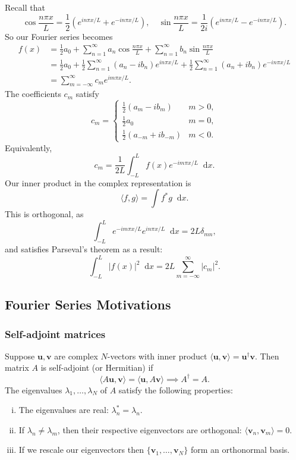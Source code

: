\documentclass[12pt]{article}
\newcommand{\diff}{\mathop{}\!\mathrm{d}}
\theoremstyle{definition}
\theoremstyle{remark}
\begin{document}
Recall that
\[
	\cos \frac{n \pi x}{L} = \frac{1}{2} \left( e^{i n \pi x/L} + e^{-i n \pi x/L}\right), \quad \sin \frac{n \pi x}{L} = \frac{1}{2i} \left(e^{i n \pi x/L} - e^{-i n \pi x/L}\right)
.\]
So our Fourier series becomes
\begin{align*}
	f(x) &= \frac{1}{2} a_0 + \sum_{n = 1}^{\infty}a_n \cos \frac{n \pi x}{L} + \sum_{n = 1}^{\infty} b_n \sin \frac{n \pi x}{L} \\
	     &= \frac{1}{2} a_0 + \frac{1}{2} \sum_{n = 1}^{\infty}(a_n - i b_n) e^{i n \pi x/L} + \frac{1}{2} \sum_{n = 1}^{\infty}(a_n + i b_n) e^{-i n \pi x/L} \\
	     &= \sum_{m = -\infty}^{\infty} c_m e^{i m \pi x/L}.
\end{align*}
The coefficients $c_m$ satisfy
\[
c_m =
\begin{cases}
	\frac{1}{2}(a_{m} - ib_{m}) & m > 0, \\
	\frac{1}{2} a_0 & m = 0, \\
	\frac{1}{2}(a_{-m} + i b_{-m}) & m < 0.
\end{cases}
\]
Equivalently,
\[
	c_m = \frac{1}{2L}\int_{-L}^{L}f(x) e^{-i m \pi x/L}\diff x
.\]
Our inner product in the complex representation is
\[
	\langle f, g \rangle = \int f^{\ast}g \diff x
.\]
This is orthogonal, as
\[
\int_{-L}^{L} e^{-i m \pi x/L}e^{i n \pi x/L} \diff x = 2L \delta_{mn}
,\]
and satisfies Parseval's theorem as a result:
\[
	\int_{-L}^{L}|f(x)|^2\diff x = 2L \sum_{m = -\infty}^{\infty}|c_m|^2
.\]

\subsection{Fourier Series Motivations}%
\label{sub:fourier_series_motivations}

\subsubsection{Self-adjoint matrices}%
\label{subsub:self_adjoint_matrices}

Suppose $\mathbf{u}, \mathbf{v}$ are complex $N$-vectors with inner product $\langle \mathbf{u}, \mathbf{v} \rangle = \mathbf{u}^{\dagger} \mathbf{v}$. Then matrix $A$ is self-adjoint (or Hermitian) if
\[
	\langle A \mathbf{u}, \mathbf{v} \rangle = \langle \mathbf{u}, A \mathbf{v} \rangle \implies A^{\dagger} = A
.\]
The eigenvalues $\lambda_1, \ldots, \lambda_N$ of $A$ satisfy the following properties:
\begin{enumerate}[(i)]
	\item The eigenvalues are real: $\lambda_n^{\ast} = \lambda_n$.
	\item If $\lambda_n \neq \lambda_m$, then their respective eigenvectors are orthogonal: $\langle \mathbf{v}_n, \mathbf{v}_m \rangle = 0$.
	\item If we rescale our eigenvectors then $\{\mathbf{v}_1, \ldots, \mathbf{v}_N\}$ form an orthonormal basis.
\end{enumerate}
\end{document}
